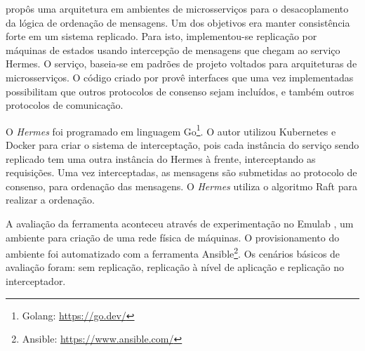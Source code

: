 
\textcite{renan2021hermes} propôs uma arquitetura em ambientes de microsserviços para o desacoplamento da lógica de ordenação de mensagens. Um dos objetivos era manter consistência forte em um sistema replicado. Para isto, implementou-se replicação por máquinas de estados usando intercepção de mensagens que chegam ao serviço Hermes. O serviço, baseia-se em padrões de projeto voltados para arquiteturas de microsserviços. O código criado por \textcite{renan2021hermes} provê interfaces que uma vez implementadas possibilitam que outros protocolos de consenso sejam incluídos, e também outros protocolos de comunicação.


O \textit{Hermes} foi programado em linguagem Go\footnote{Golang: \url{https://go.dev/}}. O autor utilizou Kubernetes e Docker para criar o sistema de interceptação, pois cada instância do serviço sendo replicado tem uma outra instância do Hermes à frente, interceptando as requisições. Uma vez interceptadas, as mensagens são submetidas ao protocolo de consenso, para ordenação das mensagens. O \textit{Hermes} utiliza o algoritmo Raft para realizar a ordenação.


A avaliação da ferramenta aconteceu através de experimentação no Emulab \cite{emulab-10.1145/844128.844152}, um ambiente para criação de uma rede física de máquinas. O provisionamento do ambiente foi automatizado com a ferramenta Ansible\footnote{Ansible: \url{https://www.ansible.com/}}. Os cenários básicos de avaliação foram: sem replicação, replicação à nível de aplicação e replicação no interceptador.



